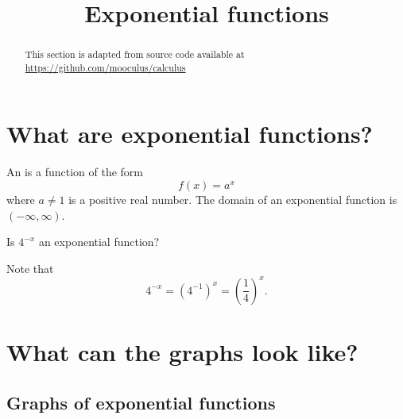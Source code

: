 \documentclass{ximera}
\title[Dig-In:]{Exponential functions}
\begin{document}
\begin{abstract}
This section is adapted from source code available at \url{https://github.com/mooculus/calculus}
\end{abstract}
\maketitle
 


\section{What are exponential functions?}
 

\begin{definition}
  An  is a function of the form
  \[
  f(x) = a^x
  \]
  where  $a\ne 1$ is a positive real number. The domain of an
  exponential function is $(-\infty,\infty)$.
\end{definition}

\begin{question}
  Is $4^{-x}$ an exponential function?
  \begin{prompt}
  \begin{multipleChoice}
  \end{multipleChoice}
  \end{prompt}
  \begin{feedback}
    Note that
    \[
    4^{-x} = \left(4^{-1}\right)^x = \left(\frac{1}{4}\right)^x.
    \]
  \end{feedback}
\end{question}



 
\section{What can the graphs look like?}
 
\subsection{Graphs of exponential functions}
 
\end{document}
